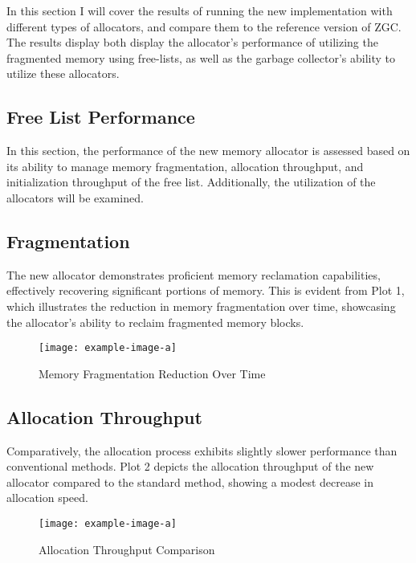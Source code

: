 
In this section I will cover the results of running the new implementation with different types of allocators, and compare them to the reference version of ZGC. The results display both display the allocator's performance of utilizing the fragmented memory using free-lists, as well as the garbage collector's ability to utilize these allocators.

\subsection{Free List Performance}

In this section, the performance of the new memory allocator is assessed based on its ability to manage memory fragmentation, allocation throughput, and initialization throughput of the free list. Additionally, the utilization of the allocators will be examined.

\subsection{Fragmentation}
The new allocator demonstrates proficient memory reclamation capabilities, effectively recovering significant portions of memory. This is evident from Plot 1, which illustrates the reduction in memory fragmentation over time, showcasing the allocator's ability to reclaim fragmented memory blocks.

\begin{figure}[h]
\centering
\texttt{[image: example-image-a]}
\caption{Memory Fragmentation Reduction Over Time}
\label{fig:memory-fragmentation}
\end{figure}

\subsection{Allocation Throughput}

Comparatively, the allocation process exhibits slightly slower performance than conventional methods. Plot 2 depicts the allocation throughput of the new allocator compared to the standard method, showing a modest decrease in allocation speed.

\begin{figure}[h]
\centering
\texttt{[image: example-image-a]}
\caption{Allocation Throughput Comparison}
\label{fig:allocation-throughput}
\end{figure}

